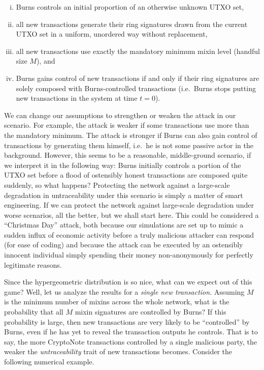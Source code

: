 \documentclass{mrl}
\begin{document}
\begin{enumerate}[(i)]
\item Burns controls an initial proportion of an otherwise unknown UTXO set,
\item all new transactions generate their ring signatures drawn from the current UTXO set in a uniform, unordered way without replacement,
\item all new transactions use exactly the mandatory minimum mixin level (handful size $M$), and
\item Burns gains control of new transactions if and only if their ring signatures are solely composed with Burns-controlled transactions (i.e.\ Burns stops putting new transactions in the system at time $t=0$).
\end{enumerate}

We can change our assumptions to strengthen or weaken the attack in our scenario.  For example, the attack is weaker if some transactions use more than the mandatory minimum. The attack is stronger if Burns can also gain control of transactions by generating them himself, i.e.\ he is not some passive actor in the background. However, this seems to be a reasonable, middle-ground scenario, if we interpret it in the following way: Burns initially controls a portion of the UTXO set before a flood of ostensibly honest transactions are composed quite suddenly, so what happens? Protecting the network against a large-scale degradation in untraceability under this scenario is simply a matter of smart engineering. If we can protect the network against large-scale degradation under worse scenarios, all the better, but we shall start here. This could be considered a ``Christmas Day'' attack, both because our simulations are set up to mimic a sudden influx of economic activity before a truly malicious attacker can respond (for ease of coding) and because the attack can be executed by an ostensibly innocent individual simply spending their money non-anonymously for perfectly legitimate reasons.

Since the hypergeometric distribution is so nice, what can we expect out of this game? Well, let us analyze the results for a \emph{single new transaction}. Assuming $M$ is the minimum number of mixins across the whole network, what is the probability that all $M$ mixin signatures are controlled by Burns? If this probability is large, then new transactions are very likely to be ``controlled'' by Burns, even if he has yet to reveal the transaction outputs he controls. That is to say, the more CryptoNote transactions controlled by a single malicious party, the weaker the \emph{untraceability} trait of new transactions becomes. Consider the following numerical example. 
\end{document}
